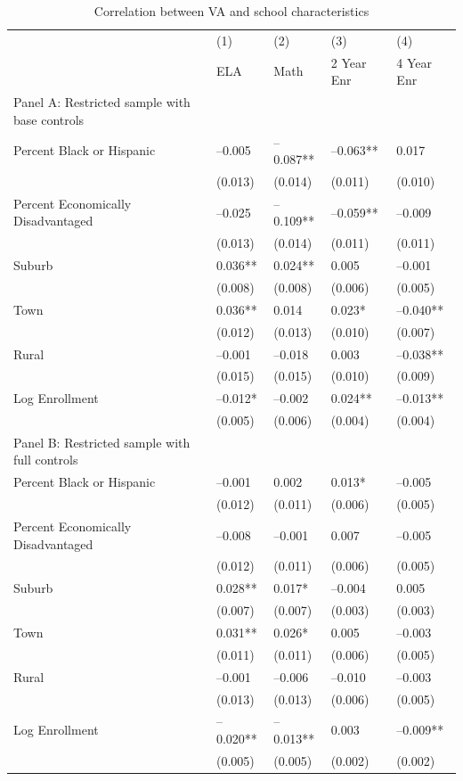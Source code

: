 \begin{table}[tbp] \centering
{}

\caption{Correlation between VA and school characteristics}
{\footnotesize
\begin{tabularx}{\linewidth}{lCCCC}

\toprule
&{(1)}&{(2)}&{(3)}&{(4)} \tabularnewline
{} & ELA & Math & 2 Year Enr & 4 Year Enr \tabularnewline
\midrule \addlinespace[\belowrulesep]
Panel A: Restricted sample with base controls&&&& \tabularnewline
\midrule Percent Black or Hispanic&--0.005&--0.087**&--0.063**&0.017 \tabularnewline
&(0.013)&(0.014)&(0.011)&(0.010) \tabularnewline
\midrule Percent Economically Disadvantaged&--0.025&--0.109**&--0.059**&--0.009 \tabularnewline
&(0.013)&(0.014)&(0.011)&(0.011) \tabularnewline
\midrule Suburb&0.036**&0.024**&0.005&--0.001 \tabularnewline
&(0.008)&(0.008)&(0.006)&(0.005) \tabularnewline
Town&0.036**&0.014&0.023*&--0.040** \tabularnewline
&(0.012)&(0.013)&(0.010)&(0.007) \tabularnewline
Rural&--0.001&--0.018&0.003&--0.038** \tabularnewline
&(0.015)&(0.015)&(0.010)&(0.009) \tabularnewline
\midrule Log Enrollment&--0.012*&--0.002&0.024**&--0.013** \tabularnewline
&(0.005)&(0.006)&(0.004)&(0.004) \tabularnewline
\midrule \midrule Panel B: Restricted sample with full controls&&&& \tabularnewline
\midrule Percent Black or Hispanic&--0.001&0.002&0.013*&--0.005 \tabularnewline
&(0.012)&(0.011)&(0.006)&(0.005) \tabularnewline
\midrule Percent Economically Disadvantaged&--0.008&--0.001&0.007&--0.005 \tabularnewline
&(0.012)&(0.011)&(0.006)&(0.005) \tabularnewline
\midrule Suburb&0.028**&0.017*&--0.004&0.005 \tabularnewline
&(0.007)&(0.007)&(0.003)&(0.003) \tabularnewline
Town&0.031**&0.026*&0.005&--0.003 \tabularnewline
&(0.011)&(0.011)&(0.006)&(0.005) \tabularnewline
Rural&--0.001&--0.006&--0.010&--0.003 \tabularnewline
&(0.013)&(0.013)&(0.006)&(0.005) \tabularnewline
\midrule Log Enrollment&--0.020**&--0.013**&0.003&--0.009** \tabularnewline
&(0.005)&(0.005)&(0.002)&(0.002) \tabularnewline
\bottomrule 

\end{tabularx}
}
\end{table}
